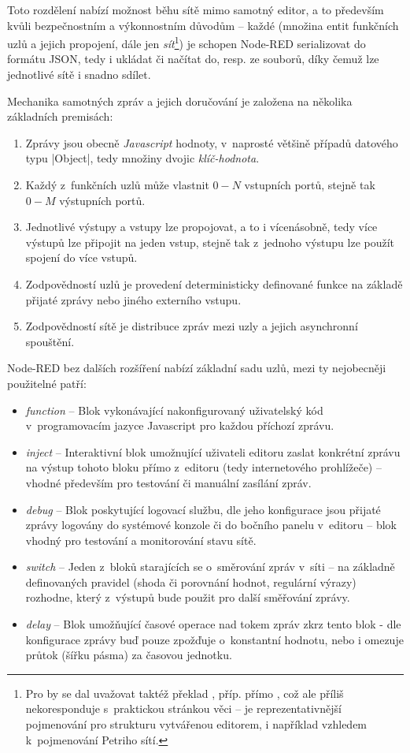 Toto rozdělení nabízí možnost běhu sítě mimo samotný editor, a to především kvůli bezpečnostním a
výkonnostním důvodům -- každé  (množina entit funkčních uzlů a jejich propojení, dále jen
\emph{sít}\footnote{Pro  by se dal uvažovat taktéž překlad ,
příp. přímo , což ale příliš nekoresponduje s~praktickou stránkou věci --  je reprezentativnější
pojmenování pro strukturu vytvářenou editorem, i například vzhledem k~pojmenování Petriho sítí.}) je schopen
Node-RED serializovat do formátu JSON, tedy i ukládat či načítat do, resp. ze souborů, díky čemuž lze jednotlivé sítě i snadno sdílet.

Mechanika samotných zpráv a jejich doručování je založena na několika základních premisách:
\begin{enumerate}
    \item Zprávy jsou obecně \emph{Javascript} hodnoty, v~naprosté většině případů datového typu \ic|Object|, tedy množiny dvojic \emph{klíč-hodnota}.
    \item Každý z~funkčních uzlů může vlastnit $0-N$ vstupních portů, stejně tak $0-M$ výstupních portů.
    \item Jednotlivé výstupy a vstupy lze propojovat, a to i vícenásobně, tedy více výstupů lze připojit na jeden vstup,
    stejně tak z~jednoho výstupu lze použít spojení do více vstupů.
    \item Zodpovědností uzlů je provedení deterministicky definované funkce na základě přijaté zprávy nebo
    jiného externího vstupu.
    \item Zodpovědností sítě je distribuce zpráv mezi uzly a jejich asynchronní spouštění.
\end{enumerate}

Node-RED bez dalších rozšíření nabízí základní sadu uzlů, mezi ty nejobecněji použitelné patří:

\begin{itemize}
    \item\emph{function} -- Blok vykonávající nakonfigurovaný uživatelský kód v~programovacím jazyce Javascript pro
    každou příchozí zprávu.
    \item\emph{inject} -- Interaktivní blok umožnující uživateli editoru zaslat konkrétní zprávu na výstup tohoto bloku
    přímo z~editoru (tedy internetového prohlížeče) -- vhodné především pro testování či manuální zasílání zpráv.
    \item\emph{debug} -- Blok poskytující logovací službu, dle jeho konfigurace jsou přijaté zprávy logovány do systémové konzole či do
    bočního panelu v~editoru -- blok vhodný pro testování a monitorování stavu sítě.
    \item\emph{switch} -- Jeden z~bloků starajících se o~směrování zpráv v~síti -- na základně definovaných pravidel
    (shoda či porovnání hodnot, regulární výrazy) rozhodne, který z~výstupů bude použit pro další směřování zprávy.
    \item\emph{delay} -- Blok umožňující časové operace nad tokem zpráv zkrz tento blok - dle konfigurace zprávy buď
    pouze zpožďuje o~konstantní hodnotu, nebo i omezuje průtok (šířku pásma) za časovou jednotku.
\end{itemize}

